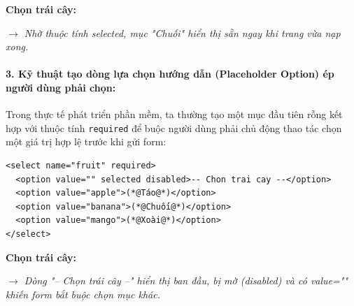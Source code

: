 \documentclass[11pt,oneside]{book}
\newcommand{\codeinline}[1]{\textcolor{accentOrange}{\texttt{#1}}}
\begin{document}
\begin{browserWindow}
\sffamily\small
\textbf{Chọn trái cây:} \par\vspace{4pt}
\tcbox[on line, arc=3pt, colback=white, colframe=primaryBlue!50, boxsep=3pt, left=8pt, right=20pt, top=3pt, bottom=3pt]{%
  \small \textcolor{black}{Chuối} \;\; \textcolor{primaryBlue}{\textbf{$\boldsymbol{\vee}$}}%
} \par\vspace{4pt}
\textcolor{codeComment}{\small\textit{$\rightarrow$ Nhờ thuộc tính selected, mục "Chuối" hiển thị sẵn ngay khi trang vừa nạp xong.}}
\end{browserWindow}

\paragraph{3. Kỹ thuật tạo dòng lựa chọn hướng dẫn (Placeholder Option) ép người dùng phải chọn:}
Trong thực tế phát triển phần mềm, ta thường tạo một mục đầu tiên rỗng kết hợp với thuộc tính \codeinline{required} để buộc người dùng phải chủ động thao tác chọn một giá trị hợp lệ trước khi gửi form:

\begin{codeWindow}
\begin{lstlisting}[language=HTML5]
<select name="fruit" required>
  <option value="" selected disabled>-- Chon trai cay --</option>
  <option value="apple">(*@Táo@*)</option>
  <option value="banana">(*@Chuối@*)</option>
  <option value="mango">(*@Xoài@*)</option>
</select>
\end{lstlisting}
\end{codeWindow}

\begin{browserWindow}
\sffamily\small
\textbf{Chọn trái cây:} \par\vspace{4pt}
\tcbox[on line, arc=3pt, colback=white, colframe=primaryBlue!50, boxsep=3pt, left=8pt, right=20pt, top=3pt, bottom=3pt]{%
  \small \textcolor{gray!70}{-- Chọn trái cây --} \;\; \textcolor{primaryBlue}{\textbf{$\boldsymbol{\vee}$}}%
} \par\vspace{4pt}
\textcolor{codeComment}{\small\textit{$\rightarrow$ Dòng "-- Chọn trái cây --" hiển thị ban đầu, bị mờ (disabled) và có value="" khiến form bắt buộc chọn mục khác.}}
\end{browserWindow}
\end{document}
